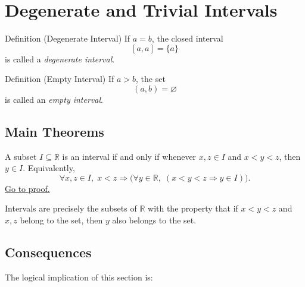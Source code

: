 \section*{Degenerate and Trivial Intervals}

\begin{definitionbox}{Definition (Degenerate Interval)}
If $a=b$, the closed interval
\[
[a,a] = \{a\}
\]
is called a \emph{degenerate interval}.
\end{definitionbox}

\begin{definitionbox}{Definition (Empty Interval)}
If $a>b$, the set
\[
(a,b) = \varnothing
\]
is called an \emph{empty interval}.
\end{definitionbox}

\subsection*{Main Theorems}

\begin{theorem}
\label{thm:convexity-characterization-of-intervals-in-r}
A subset $I \subseteq \mathbb{R}$ is an interval if and only if
whenever $x,z \in I$ and $x < y < z$, then $y \in I$.
Equivalently,
\[
\forall x,z \in I,\; x<z \Rightarrow
\bigl(
\forall y \in \mathbb{R},\;
(x<y<z \Rightarrow y \in I)
\bigr).
\]
\hyperref[prf:convexity-characterization-of-intervals-in-r]{Go to proof.}
\end{theorem}



\begin{remark*}
Intervals are precisely the subsets of $\mathbb{R}$ with the property that if
$x<y<z$ and $x,z$ belong to the set, then $y$ also belongs to the set.
\end{remark*}

\subsection*{Consequences}

\begin{exposition}
The logical implication of this section is:
\end{exposition}

